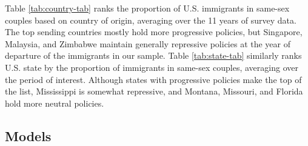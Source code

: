 \documentclass[
  11pt,
]{article}
\begin{document}
Table \ref{tab:country-tab} ranks the proportion of U.S. immigrants in same-sex couples based on country of origin, averaging over the 11 years of survey data. The top sending countries mostly hold more progressive policies, but Singapore, Malaysia, and Zimbabwe maintain generally repressive policies at the year of departure of the immigrants in our sample. Table \ref{tab:state-tab} similarly ranks U.S. state by the proportion of immigrants in same-sex couples, averaging over the period of interest. Although states with progressive policies make the top of the list, Mississippi is somewhat repressive, and Montana, Missouri, and Florida hold more neutral policies.

\hypertarget{models}{%
\subsection{Models}\label{models}}
\end{document}
